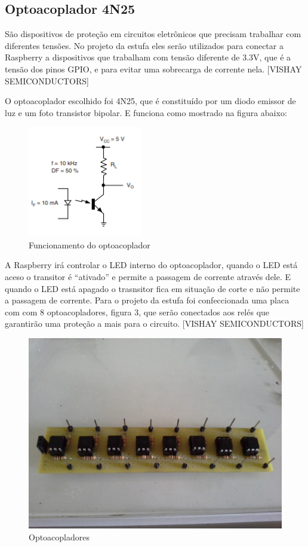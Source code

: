 \subsection{Optoacoplador 4N25}

São dispositivos de proteção em circuitos eletrônicos que precisam trabalhar com diferentes tensões. No projeto da estufa eles serão utilizados para conectar a Raspberry a dispositivos que trabalham com tensão diferente de 3.3V, que é a tensão dos pinos GPIO, e para evitar uma sobrecarga de corrente nela.  [VISHAY SEMICONDUCTORS]

O optoacoplador escolhido foi 4N25, que é constituído por um diodo emissor de luz e um foto transistor bipolar. E funciona como mostrado na figura abaixo:

\begin{figure}[H]
	\centering
	\includegraphics[width=5cm]{figuras/optocoaplador.png}
	\caption{Funcionamento do optoacoplador} \label{optocoaplador}
\end{figure}

A Raspberry irá controlar o LED interno do optoacoplador, quando o LED está aceso o transitor é “ativado” e permite a passagem de corrente através dele. E quando o LED está apagado o trasnsitor fica em situação de corte e não permite a passagem de corrente.
Para o projeto da estufa foi confeccionada uma placa com com 8 optoacopladores, figura 3,  que serão conectados aos relés que garantirão uma proteção a mais para o circuito. [VISHAY SEMICONDUCTORS]

\begin{figure}[H]
	\centering
	\includegraphics[width=15cm]{figuras/optoacopladores.jpg}
	\caption{Optoacopladores} \label{optoacopladores}
\end{figure}

